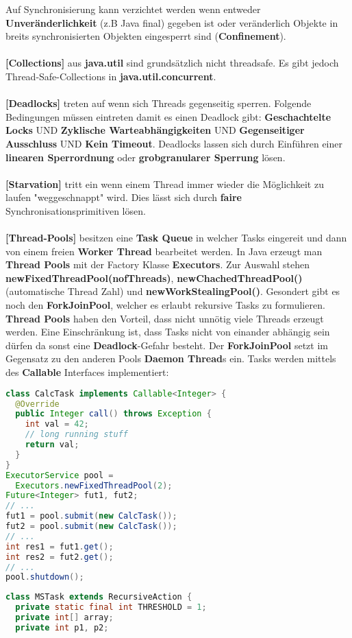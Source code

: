 \documentclass[8pt]{extarticle}
\let\oldtextbf\textbf
\renewcommand{\textbf}{\tiny\oldtextbf}
\begin{document}
\begin{multicols*}{5}
Auf Synchronisierung kann verzichtet werden wenn entweder \textbf{Unveränderlichkeit} (z.B Java final) gegeben ist oder veränderlich Objekte in breits synchronisierten Objekten eingesperrt sind (\textbf{Confinement}).\\\\
\textbf{[Collections]} aus \textbf{java.util} sind grundsätzlich nicht threadsafe. Es gibt jedoch Thread-Safe-Collections in \textbf{java.util.concurrent}.\\\\
\textbf{[Deadlocks]} treten auf wenn sich Threads gegenseitig sperren. Folgende Bedingungen müssen eintreten damit es einen Deadlock gibt: \textbf{Geschachtelte Locks} UND \textbf{Zyklische Warteabhängigkeiten} UND \textbf{Gegenseitiger Ausschluss} UND \textbf{Kein Timeout}. Deadlocks lassen sich durch Einführen einer \textbf{linearen Sperrordnung} oder \textbf{grobgranularer Sperrung} lösen.\\\\
\textbf{[Starvation]} tritt ein wenn einem Thread immer wieder die Möglichkeit zu laufen "weggeschnappt" wird. Dies lässt sich durch \textbf{faire} Synchronisationsprimitiven lösen.\\\\
\textbf{[Thread-Pools]} besitzen eine \textbf{Task Queue} in welcher Tasks eingereit und dann von einem freien \textbf{Worker Thread} bearbeitet werden. In Java erzeugt man \textbf{Thread Pools} mit der Factory Klasse \textbf{Executors}. Zur Auswahl stehen \textbf{newFixedThreadPool(nofThreads)}, \textbf{newChachedThreadPool()} (automatische Thread Zahl) und \textbf{newWorkStealingPool()}. Gesondert gibt es noch den \textbf{ForkJoinPool}, welcher es erlaubt rekursive Tasks zu formulieren. \textbf{Thread Pools} haben den Vorteil, dass nicht unnötig viele Threads erzeugt werden. Eine Einschränkung ist, dass Tasks nicht von einander abhängig sein dürfen da sonst eine \textbf{Deadlock}-Gefahr besteht. Der \textbf{ForkJoinPool} setzt im Gegensatz zu den anderen Pools \textbf{Daemon Thread}s ein. Tasks werden mittels des \textbf{Callable} Interfaces implementiert:
\begin{lstlisting}[language=java]
class CalcTask implements Callable<Integer> {
  @Override
  public Integer call() throws Exception {
    int val = 42;
    // long running stuff
    return val;
  }
}
ExecutorService pool =
  Executors.newFixedThreadPool(2);
Future<Integer> fut1, fut2;
// ...
fut1 = pool.submit(new CalcTask());
fut2 = pool.submit(new CalcTask());
// ...
int res1 = fut1.get();
int res2 = fut2.get();
// ...
pool.shutdown();
\end{lstlisting}
\begin{lstlisting}[language=java]
class MSTask extends RecursiveAction {
  private static final int THRESHOLD = 1;
  private int[] array;
  private int p1, p2;


\end{lstlisting}
\end{multicols*}
\end{document}
